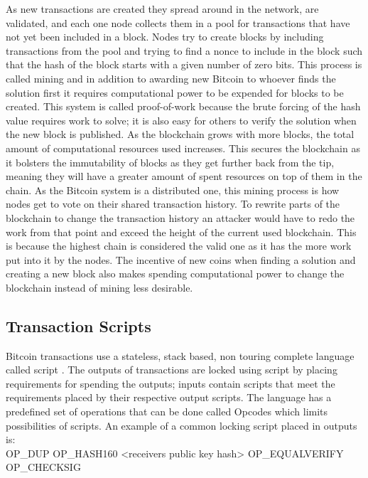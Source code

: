 As new transactions are created they spread around in the network, are validated, and each one node collects them in a pool for transactions that have not yet been included in a block. Nodes try to create blocks by including transactions from the pool and trying to find a nonce to include in the block such that the hash of the block starts with a given number of zero bits. This process is called mining and in addition to awarding new Bitcoin to whoever finds the solution first it requires computational power to be expended for blocks to be created. This system is called proof-of-work because the brute forcing of the hash value requires work to solve; it is also easy for others to verify the solution when the new block is published. As the blockchain grows with more blocks, the total amount of computational resources used increases. This secures the blockchain as it bolsters the immutability of blocks as they get further back from the tip, meaning they will have a greater amount of spent resources on top of them in the chain. As the Bitcoin system is a distributed one, this mining process is how nodes get to vote on their shared transaction history.
To rewrite parts of the blockchain to change the transaction history an attacker would have to redo the work from that point and exceed the height of the current used blockchain. This is because the highest chain is considered the valid one as it has the more work put into it by the nodes. The incentive of new coins when finding a solution and creating a new block also makes spending computational power to change the blockchain instead of mining less desirable. 


\subsection{Transaction Scripts}

Bitcoin transactions use a stateless, stack based, non touring complete language called script \cite{antonopoulos2017mastering}.
The outputs of transactions are locked using script by placing requirements for spending the outputs; inputs contain scripts that meet the requirements placed by their respective output scripts. The language has a predefined set of operations that can be done called Opcodes which limits possibilities of scripts. 
An example of a common locking script placed in outputs is: 
\\

OP\_DUP OP\_HASH160 <receivers public key hash> OP\_EQUALVERIFY OP\_CHECKSIG
\\

